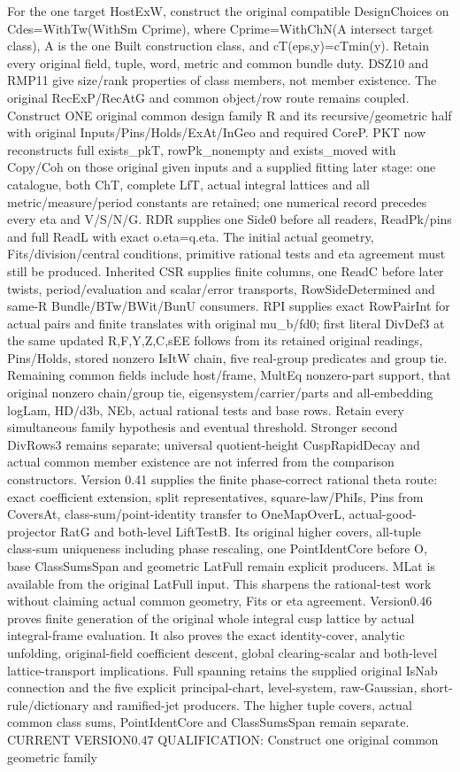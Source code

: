 \documentclass[11pt,a4paper]{article}
\numberwithin{equation}{section}
\theoremstyle{remark}\newtheorem{remark}[theorem]{Remark}
\begin{document}
For the one target HostExW, construct the original compatible DesignChoices on Cdes=WithTw(WithSm Cprime), where Cprime=WithChN(A intersect target class), A is the one Built construction class, and cT(eps,y)=cTmin(y). Retain every original field, tuple, word, metric and common bundle duty. DSZ10 and RMP11 give size/rank properties of class members, not member existence. The original RecExP/RecAtG and common object/row route remains coupled. Construct ONE original common design family R and its recursive/geometric half with original Inputs/Pins/Holds/ExAt/InGeo and required CoreP. PKT now reconstructs full exists\_\allowbreak pkT, rowPk\_\allowbreak nonempty and exists\_\allowbreak moved with Copy/Coh on those original given inputs and a supplied fitting later stage: one catalogue, both ChT, complete LfT, actual integral lattices and all metric/measure/period constants are retained; one numerical record precedes every eta and V/S/N/G. RDR supplies one Side0 before all readers, ReadPk/pins and full ReadL with exact o.eta=q.eta. The initial actual geometry, Fits/division/central conditions, primitive rational tests and eta agreement must still be produced. Inherited CSR supplies finite columns, one ReadC before later twists, period/evaluation and scalar/error transports, RowSideDetermined and same-R Bundle/BTw/BWit/BunU consumers. RPI supplies exact RowPairInt for actual pairs and finite translates with original mu\_\allowbreak b/fd0; first literal DivDef3 at the same updated R,F,Y,Z,C,sEE follows from its retained original readings, Pins/Holds, stored nonzero IsItW chain, five real-group predicates and group tie. Remaining common fields include host/frame, MultEq nonzero-part support, that original nonzero chain/group tie, eigensystem/carrier/parts and all-embedding logLam, HD/d3b, NEb, actual rational tests and base rows. Retain every simultaneous family hypothesis and eventual threshold. Stronger second DivRows3 remains separate; universal quotient-height CuspRapidDecay and actual common member existence are not inferred from the comparison constructors. Version 0.41 supplies the finite phase-correct rational theta route: exact coefficient extension, split representatives, square-law/PhiIs, Pins from CoversAt, class-sum/point-identity transfer to OneMapOverL, actual-good-projector RatG and both-level LiftTestB. Its original higher covers, all-tuple class-sum uniqueness including phase rescaling, one PointIdentCore before O, base ClassSumsSpan and geometric LatFull remain explicit producers. MLat is available from the original LatFull input. This sharpens the rational-test work without claiming actual common geometry, Fits or eta agreement. Version0.46 proves finite generation of the original whole integral cusp lattice by actual integral-frame evaluation. It also proves the exact identity-cover, analytic unfolding, original-field coefficient descent, global clearing-scalar and both-level lattice-transport implications. Full spanning retains the supplied original IsNab connection and the five explicit principal-chart, level-system, raw-Gaussian, short-rule/dictionary and ramified-jet producers. The higher tuple covers, actual common class sums, PointIdentCore and ClassSumsSpan remain separate. CURRENT VERSION0.47 QUALIFICATION: Construct one original common geometric family 
\end{document}
